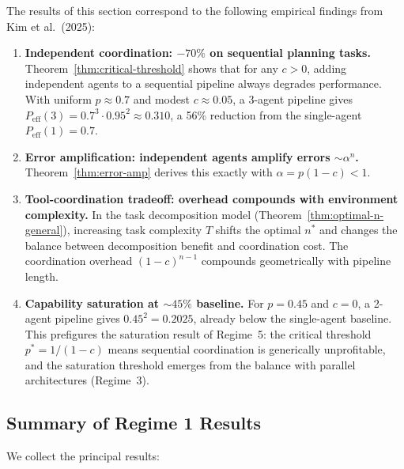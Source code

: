 \begin{remark}
\label{rmk:empirical}
The results of this section correspond to the following empirical findings from
Kim et al.\ (2025):

\begin{enumerate}
\item \textbf{Independent coordination: $-70\%$ on sequential planning tasks.}
  Theorem~\ref{thm:critical-threshold} shows that for any $c > 0$, adding
  independent agents to a sequential pipeline always degrades performance.
  With uniform $p \approx 0.7$ and modest $c \approx 0.05$, a 3-agent pipeline gives
  $P_{\mathrm{eff}}(3) = 0.7^3 \cdot 0.95^2 \approx 0.310$, a 56\% reduction from the
  single-agent $P_{\mathrm{eff}}(1) = 0.7$.

\item \textbf{Error amplification: independent agents amplify errors $\sim\alpha^n$.}
  Theorem~\ref{thm:error-amp} derives this exactly with $\alpha = p(1-c) < 1$.

\item \textbf{Tool-coordination tradeoff: overhead compounds with environment complexity.}
  In the task decomposition model (Theorem~\ref{thm:optimal-n-general}), increasing
  task complexity $T$ shifts the optimal $n^*$ and changes the balance between
  decomposition benefit and coordination cost. The coordination overhead
  $(1-c)^{n-1}$ compounds geometrically with pipeline length.

\item \textbf{Capability saturation at $\sim 45\%$ baseline.}
  For $p = 0.45$ and $c = 0$, a 2-agent pipeline gives $0.45^2 = 0.2025$, already
  below the single-agent baseline. This prefigures the saturation result of Regime~5:
  the critical threshold $p^* = 1/(1-c)$ means sequential coordination is generically
  unprofitable, and the saturation threshold emerges from the balance with parallel
  architectures (Regime~3).
\end{enumerate}
\end{remark}

\subsection{Summary of Regime 1 Results}

We collect the principal results:

